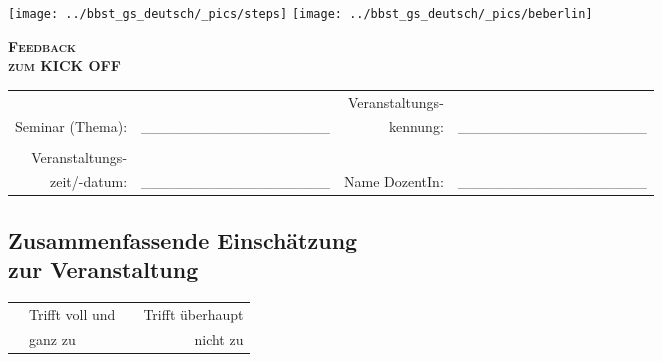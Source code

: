 \documentclass[a4paper]{article}
\begin{document}
\vspace{-0.5cm}

\texttt{[image: ../bbst\_gs\_deutsch/\_pics/steps]} \hspace{4.9cm}
\texttt{[image: ../bbst\_gs\_deutsch/\_pics/beberlin]}

\vspace{.5cm}

\begin{center}
	\textbf{\Huge \scshape Feedback} \\ \vspace{0.3cm}
	\textbf{\huge \scshape zum KICK OFF}
\end{center}

\vspace{.5cm}

\begin{tabular}{rlrl}
& & Veranstaltungs- & \\
Seminar (Thema): & \_\_\_\_\_\_\_\_\_\_\_\_\_\_\_\_\_\_ & 
kennung: & \_\_\_\_\_\_\_\_\_\_\_\_\_\_\_\_\_\_ \\ 
& \\
Veranstaltungs- & & & \\
zeit/-datum: & \_\_\_\_\_\_\_\_\_\_\_\_\_\_\_\_\_\_ &
Name DozentIn: & \_\_\_\_\_\_\_\_\_\_\_\_\_\_\_\_\_\_
\end{tabular}

\vspace{.5cm}

\subsection*{Zusammenfassende Einschätzung \\ zur Veranstaltung}

\vspace{-1.3cm}

\begin{tabular}{p{7cm} l p{1cm} r}
	& Trifft voll und & & Trifft überhaupt \\
	& ganz zu 				& & nicht zu
\end{tabular}

\vspace{-.1cm}


 \\
\end{document}
